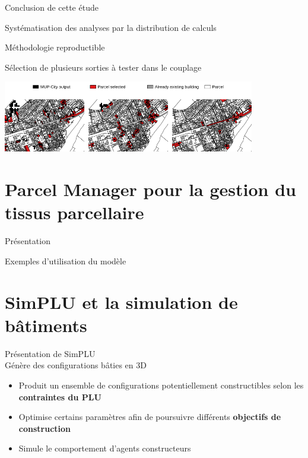 \documentclass[xcolor=table]{beamer}
\begin{document}
\begin{frame}{Conclusion de cette étude}
	\begin{description}
		\item Systématisation des analyses par la distribution de calculs
		\item Méthodologie reproductible
		\item Sélection de plusieurs sorties à tester dans le couplage\\
	\end{description}
	\begin{block}{}\centering\includegraphics[width=11cm]{Images/exMup.png}\end{block}	
\end{frame}


\section[Parcel Manager]{Parcel Manager pour la gestion du tissus parcellaire}

\begin{frame}{Présentation}
	
\end{frame}

\begin{frame}{Exemples d'utilisation du modèle}
	
\end{frame}

\section[SimPLU]{SimPLU et la simulation de bâtiments}



\begin{frame}{Présentation de SimPLU}
	\\
	Génère des configurations bâties en 3D
	\begin{itemize}
		\item Produit un ensemble de configurations potentiellement constructibles selon les \textbf{contraintes du PLU}
		\item Optimise certains paramètres afin de poursuivre différents \textbf{objectifs de construction}
		\item Simule le comportement d'agents constructeurs
	\end{itemize} 
\end{frame}
\end{document}
